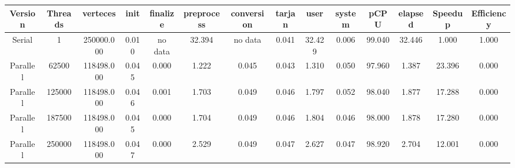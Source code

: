 \begin{tabular}{|c|c|c|c|c|c|c|c|c|c|c|c|c|c|}
\toprule
 Version &  Threads &   verteces &  init & finalize &  preprocess & conversion &  tarjan &   user &  system &   pCPU &  elapsed &  Speedup &  Efficiency \\
\midrule
  Serial &        1 & 250000.000 & 0.010 &  no data &      32.394 &    no data &   0.041 & 32.429 &   0.006 & 99.040 &   32.446 &    1.000 &       1.000 \\
Parallel &    62500 & 118498.000 & 0.045 &    0.000 &       1.222 &      0.045 &   0.043 &  1.310 &   0.050 & 97.960 &    1.387 &   23.396 &       0.000 \\
Parallel &   125000 & 118498.000 & 0.046 &    0.001 &       1.703 &      0.049 &   0.046 &  1.797 &   0.052 & 98.040 &    1.877 &   17.288 &       0.000 \\
Parallel &   187500 & 118498.000 & 0.045 &    0.000 &       1.704 &      0.049 &   0.046 &  1.804 &   0.046 & 98.000 &    1.878 &   17.280 &       0.000 \\
Parallel &   250000 & 118498.000 & 0.047 &    0.000 &       2.529 &      0.049 &   0.047 &  2.627 &   0.047 & 98.920 &    2.704 &   12.001 &       0.000 \\
\bottomrule
\end{tabular}
